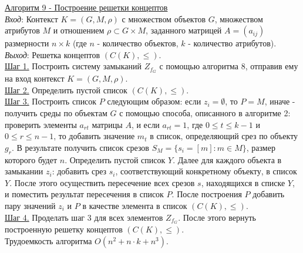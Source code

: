 \documentclass[bachelor, och, labwork]{shiza}
\begin{document}
        \underline{Алгоритм 9 - Построение решетки концептов}\\
            \textit{Вход}: Контекст $K = (G, M, \rho)$ с множеством объектов $G$, множеством атрибутов $M$ и отношением
            $\rho \subset G \times M$, заданного матрицей $A = (a_{ij})$ размерности $n \times k$ (где $n$ - количество
            объектов, $k$ - количество атрибутов). \\
            \textit{Выход}: Решетка концептов $(C(K), \leq)$. \\
            \underline{Шаг 1.} Построить систему замыканий $Z_{f_G}$ с помощью алгоритма 8, отправив ему на вход
            контекст $K = (G, M, \rho)$. \\
            \underline{Шаг 2.} Определить пустой список $(C(K), \leq)$.\\
            \underline{Шаг 3.} Построить список $P$ следующим образом: если $z_i = \emptyset$, то $P = M$, иначе -
            получить среды по объектам $G$ с помощью способа, описанного в алгоритме 2: проверить элементы $a_{rt}$
            матрицы $A$, и если $a_{rt} = 1$, где $0 \leq t \leq k - 1$ и $0 \leq r \leq n - 1$, то добавить значение
            $m_t$ в список, определяющий срез по объекту $g_r$. В результате получить список срезов $S_M = \{s_i = [m]:
            m \in M\}$, размер которого будет $n$. Определить пустой список $Y$. Далее для каждого объекта в замыкании
            $z_i$: добавить срез $s_i$, соответствующий конкретному объекту, в список $Y$. После этого осуществить
            пересечение всех срезов $s$, находящихся в списке $Y$, и поместить результат пересечения в список $P$. После
            построения $P$ добавить пару значений $z_i$ и $P$ в качестве элемента в список $(C(K), \leq)$.\\
            \underline{Шаг 4.} Проделать шаг 3 для всех элементов $Z_{f_G}$. После этого вернуть построенную решетку
            концептов $(C(K), \leq)$. \\

            Трудоемкость алгоритма $O(n^2 + n \cdot k + n^3)$.\\



\end{document}

